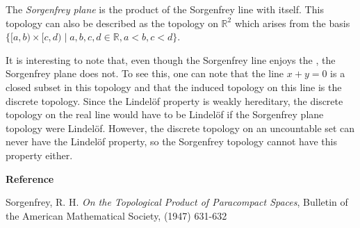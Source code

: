 \documentclass[12pt]{article}
\begin{document}
The \emph{Sorgenfrey plane} is the product of the Sorgenfrey line with itself.  This topology can also be described as the topology on $\mathbb{R}^2$ which arises from the basis $\{ [a,b) \times [c,d) \mid a,b,c,d \in \mathbb{R}, a < b , c < d \}$.

It is interesting to note that, even though the Sorgenfrey line 
enjoys the , the 
Sorgenfrey plane does not.  To see this, one can note that the 
line $x + y = 0$ is a closed subset in this topology and that 
the induced topology on this line is the discrete topology.  
Since the Lindel\"of property is weakly hereditary, the 
discrete topology on the real line would have to be Lindel\"of 
if the Sorgenfrey plane topology were Lindel\"of.  However, the 
discrete topology on an uncountable set can never have the 
Lindel\"of property, so the Sorgenfrey topology cannot have 
this property either.

{\bf Reference}

Sorgenfrey, R. H. \emph{On the Topological Product of Paracompact Spaces}, Bulletin of the American Mathematical Society, (1947) 631-632
\end{document}
